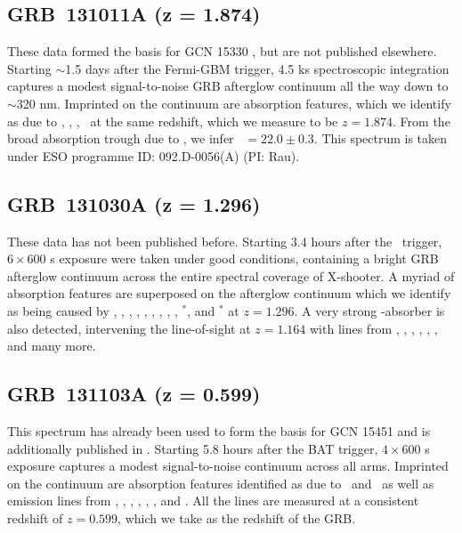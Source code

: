 \documentclass[longauth]{aa}    %
\begin{document}
\subsection{GRB~131011A (z = 1.874)}\label{131011}

These data formed the basis for GCN 15330 \citep{GCN15330}, but are not published
elsewhere. Starting $\sim$1.5 days after the Fermi-GBM trigger, 4.5 ks
spectroscopic integration captures a modest signal-to-noise GRB afterglow
continuum all the way down to $\sim$320 nm. Imprinted on the continuum are
absorption features, which we identify as due to \lya, \feii,  \mgii, \mgi~at
the same redshift, which we measure to be $z = 1.874$. From the broad absorption
trough due to \lya, we infer \nh~$= 22.0 \pm 0.3$. This spectrum is taken under
ESO programme ID: 092.D-0056(A) (PI: Rau).

\subsection{GRB~131030A (z = 1.296)}	
\label{131030}

These data has not been published before. Starting 3.4 hours after the
\swift~trigger, $6\times600$ s exposure were taken under good conditions,
containing a bright GRB afterglow continuum across the entire spectral coverage
of X-shooter. A myriad of absorption features are superposed on the afterglow
continuum which we identify as being caused by \SIiv, \SIii, \civ, \alii,
\aliii, \znii, \crii, \NIii, \feii, \NIii$^*$, and \feii$^*$ at $z = 1.296$. A
very strong \mgii-absorber is also detected, intervening the line-of-sight at $z
= 1.164$ with lines from \SIii, \civ, \aliii, \aliii, \feii, \mnii, and many
more.

\subsection{GRB~131103A (z = 0.599)}\label{131103}

This spectrum has already been used to form the basis for GCN 15451
\citep{GCN15451} and is additionally published in \citet{Kruhler2015}. Starting
5.8 hours after the BAT trigger, $4\times600$ s exposure captures a modest
signal-to-noise continuum across all arms. Imprinted on the continuum are
absorption features identified as due to \feii~and \mgii~as well as emission
lines from \oii, \hd, \hg, \hb, \oiii, \ha, and \niil. All the lines are measured
at a consistent redshift of $z = 0.599$, which we take as the redshift of the
GRB.
\end{document}
